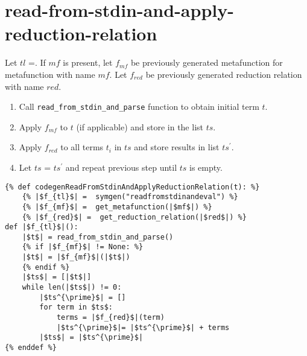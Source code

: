 \section{read-from-stdin-and-apply-reduction-relation}

Let $tl$ =\ReadFromStdinAndApplyReductionRelation. If $mf$ is present, let $f_{mf}$ be previously generated metafunction for metafunction with name $mf$. Let $f_{red}$ be previously generated reduction relation with name $red$. 

\begin{enumerate}
\item Call \texttt{read\_from\_stdin\_and\_parse} function to obtain initial term $t$.
\item Apply $f_{mf}$ to $t$ (if applicable) and store in the list $ts$.
\item Apply $f_{red}$ to all terms $t_i$ in $ts$ and store results in list $ts^{\prime}$.
\item Let $ts$ = $ts^{\prime}$ and repeat previous step until $ts$ is empty.
\end{enumerate}

\begin{verbatim}
{% def codegenReadFromStdinAndApplyReductionRelation(t): %}
	{% |$f_{tl}$| =  symgen("readfromstdinandeval") %}
	{% |$f_{mf}$| =  get_metafunction(|$mf$|) %}
	{% |$f_{red}$| =  get_reduction_relation(|$red$|) %}
def |$f_{tl}$|():
	|$t$| = read_from_stdin_and_parse()
	{% if |$f_{mf}$| != None: %}
	|$t$| = |$f_{mf}$|(|$t$|)
	{% endif %}
    |$ts$| = [|$t$|]
    while len(|$ts$|) != 0:
        |$ts^{\prime}$| = []
        for term in $ts$:
            terms = |$f_{red}$|(term)
            |$ts^{\prime}$|= |$ts^{\prime}$| + terms 
        |$ts$| = |$ts^{\prime}$|
{% enddef %}

\end{verbatim}
